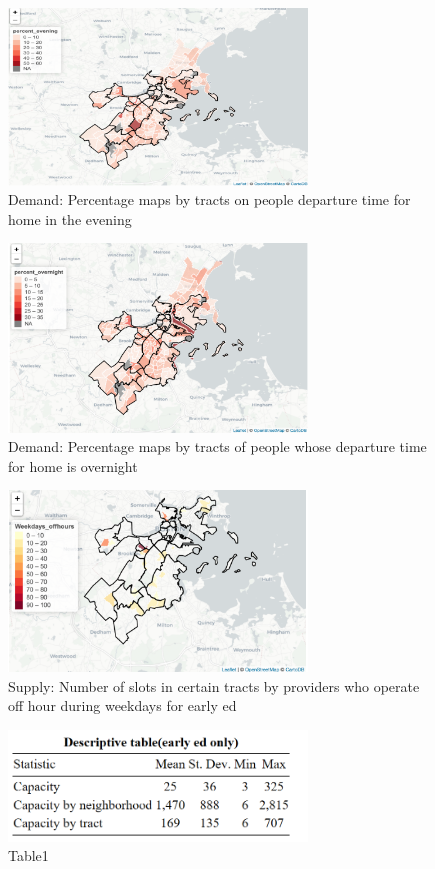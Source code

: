 \documentclass[10pt,letterpaper]{article}
\begin{document}
\begin{figure}
\centering
\includegraphics[width=3.12500in]{fig5.png}
\caption{Demand: Percentage maps by tracts on people departure time for
home in the evening}
\end{figure}

\begin{figure}
\centering
\includegraphics[width=3.12500in]{fig6.png}
\caption{Demand: Percentage maps by tracts of people whose departure
time for home is overnight}
\end{figure}

\begin{figure}
\centering
\includegraphics[width=3.12500in]{fig7.png}
\caption{Supply: Number of slots in certain tracts by providers who
operate off hour during weekdays for early ed}
\end{figure}

\begin{figure}
\centering
\includegraphics[width=3.12500in]{table1.png}
\caption{Table1}
\end{figure}
\end{document}
